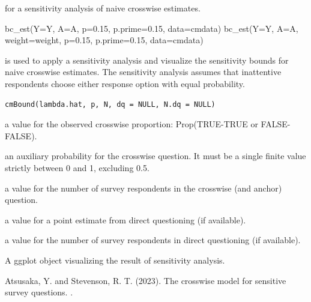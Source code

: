 \documentclass[a4paper]{book}
\begin{document}
%
\begin{SeeAlso}
[cmBound()] for a sensitivity analysis of naive crosswise estimates.
\end{SeeAlso}
%
\begin{Examples}
\begin{ExampleCode}
bc_est(Y=Y, A=A, p=0.15, p.prime=0.15, data=cmdata)
bc_est(Y=Y, A=A, weight=weight, p=0.15, p.prime=0.15, data=cmdata)
\end{ExampleCode}
\end{Examples}
%
\begin{Description}
 is used to apply a sensitivity analysis and
visualize the sensitivity bounds for naive crosswise estimates. The
sensitivity analysis assumes that inattentive respondents choose either
response option with equal probability.
\end{Description}
%
\begin{Usage}
\begin{verbatim}
cmBound(lambda.hat, p, N, dq = NULL, N.dq = NULL)
\end{verbatim}
\end{Usage}
%
\begin{Arguments}
\begin{ldescription}
\item[\code{lambda.hat}] a value for the observed crosswise proportion: Prop(TRUE-TRUE or FALSE-FALSE).

\item[\code{p}] an auxiliary probability for the crosswise question. It must be a
single finite value strictly between 0 and 1, excluding 0.5.

\item[\code{N}] a value for the number of survey respondents in the crosswise (and anchor) question.

\item[\code{dq}] a value for a point estimate from direct questioning (if available).

\item[\code{N.dq}] a value for the number of survey respondents in direct questioning (if available).
\end{ldescription}
\end{Arguments}
%
\begin{Value}
A ggplot object visualizing the result of sensitivity analysis.
\end{Value}
%
\begin{References}
Atsusaka, Y. and Stevenson, R. T. (2023). The crosswise model
for sensitive survey questions. .
\end{References}
\end{document}
